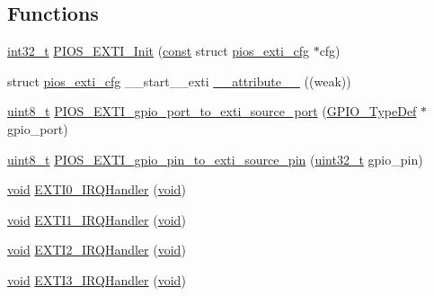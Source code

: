 \subsection*{Functions}
\begin{DoxyCompactItemize}
\item 
\hyperlink{group___n_a_m_e_gafd12020da5a235dfcf0c3c748fb5baed}{int32\-\_\-t} \hyperlink{group___p_i_o_s___e_x_t_i_gaa35c400a680d3af7d1ec1a0a3f91d93f}{P\-I\-O\-S\-\_\-\-E\-X\-T\-I\-\_\-\-Init} (\hyperlink{group___n_a_m_e_ga7ae6d0e43244213b34de2c2b9aa30da6}{const} struct \hyperlink{structpios__exti__cfg}{pios\-\_\-exti\-\_\-cfg} $\ast$cfg)
\item 
struct \hyperlink{structpios__exti__cfg}{pios\-\_\-exti\-\_\-cfg} \-\_\-\-\_\-start\-\_\-\-\_\-exti \hyperlink{group___p_i_o_s___e_x_t_i_ga5b4de0228d66143e17ab3388737b08f7}{\-\_\-\-\_\-attribute\-\_\-\-\_\-} ((weak))
\item 
\hyperlink{stdint_8h_aba7bc1797add20fe3efdf37ced1182c5}{uint8\-\_\-t} \hyperlink{group___p_i_o_s___e_x_t_i_gaf9e6020d60052741dcfc23842da0a6b8}{P\-I\-O\-S\-\_\-\-E\-X\-T\-I\-\_\-gpio\-\_\-port\-\_\-to\-\_\-exti\-\_\-source\-\_\-port} (\hyperlink{struct_g_p_i_o___type_def}{G\-P\-I\-O\-\_\-\-Type\-Def} $\ast$gpio\-\_\-port)
\item 
\hyperlink{stdint_8h_aba7bc1797add20fe3efdf37ced1182c5}{uint8\-\_\-t} \hyperlink{group___p_i_o_s___e_x_t_i_gac9299a06b0644f3775e000a1d9c500a8}{P\-I\-O\-S\-\_\-\-E\-X\-T\-I\-\_\-gpio\-\_\-pin\-\_\-to\-\_\-exti\-\_\-source\-\_\-pin} (\hyperlink{stdint_8h_a435d1572bf3f880d55459d9805097f62}{uint32\-\_\-t} gpio\-\_\-pin)
\item 
\hyperlink{group___n_a_m_e_ga18028b8badbf1ea7e704ccac3c488e82}{void} \hyperlink{group___p_i_o_s___e_x_t_i_ga17e9789a29a87d2df54f12b94dd1a0b6}{E\-X\-T\-I0\-\_\-\-I\-R\-Q\-Handler} (\hyperlink{group___n_a_m_e_ga18028b8badbf1ea7e704ccac3c488e82}{void})
\item 
\hyperlink{group___n_a_m_e_ga18028b8badbf1ea7e704ccac3c488e82}{void} \hyperlink{group___p_i_o_s___e_x_t_i_ga49cfdd46eb8d0ef3e1987514aa9343dc}{E\-X\-T\-I1\-\_\-\-I\-R\-Q\-Handler} (\hyperlink{group___n_a_m_e_ga18028b8badbf1ea7e704ccac3c488e82}{void})
\item 
\hyperlink{group___n_a_m_e_ga18028b8badbf1ea7e704ccac3c488e82}{void} \hyperlink{group___p_i_o_s___e_x_t_i_gab5a1d9e9c8ef50e0cb9ddb5745a20a14}{E\-X\-T\-I2\-\_\-\-I\-R\-Q\-Handler} (\hyperlink{group___n_a_m_e_ga18028b8badbf1ea7e704ccac3c488e82}{void})
\item 
\hyperlink{group___n_a_m_e_ga18028b8badbf1ea7e704ccac3c488e82}{void} \hyperlink{group___p_i_o_s___e_x_t_i_ga30c045de96d18ec9c67a7b9e4350920f}{E\-X\-T\-I3\-\_\-\-I\-R\-Q\-Handler} (\hyperlink{group___n_a_m_e_ga18028b8badbf1ea7e704ccac3c488e82}{void})

\end{DoxyCompactItemize}
